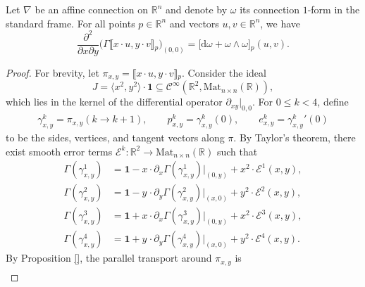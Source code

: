 \newpage 
\begin{theorem}
  Let $\nabla$ be an affine connection on $\mathbb{R}^n$ and denote by $\omega$ its connection $1$-form in the standard frame. For all points $p \in \mathbb{R}^n$ and vectors $u, v \in \mathbb{R}^n$, we have 
  \begin{equation}
    \frac{\partial^2}{\partial x \partial y} \Big( \Gamma \bigl\llbracket x \cdot u, y \cdot v \bigr\rrbracket{}_p \Big)_{(0, 0)} =  \big[\mathrm{d}\omega + \omega \wedge \omega\big]{}_p(u, v).
  \end{equation}
\end{theorem}

\begin{proof}
For brevity, let $\pi_{x, y} = \bigl\llbracket x \cdot u, y \cdot v \bigr\rrbracket{}_p$. Consider the ideal 
\begin{equation}
J = \langle x^2, y^2\rangle \cdot \mathbf{1} \subseteq \mathscr{C}^\infty(\mathbb{R}^2, \mathrm{Mat}_{n \times n}(\mathbb{R})),
\end{equation}
which lies in the kernel of the differential operator $\partial_{xy}|_{0,0}$. For $0 \leq k < 4$,  define 
  \begin{align}
    \gamma^{k}_{x, y} = \pi_{x, y}(k \to k + 1), \quad \quad p^{k}_{x,y} = \gamma^k_{x, y}(0), \quad \quad  e^k_{x, y} = {\gamma^k_{x, y}}{}'(0) 
  \end{align}
  to be the sides, vertices, and tangent vectors along $\pi$. By Taylor's theorem, there exist smooth error terms $\mathcal{E}^k \colon \mathbb{R}^2 \to \mathrm{Mat}_{n \times n}(\mathbb{R})$ such that
  \begin{align}
    \Gamma(\gamma^{1}_{x,y}) &= \mathbf{1} - x \cdot \partial_x \Gamma(\gamma^{1}_{x,y})|_{(0, y)} + x^2 \cdot \mathcal{E}^1(x, y), \\
    \Gamma(\gamma^{2}_{x,y}) &= \mathbf{1} - y \hspace{1pt} \cdot \partial_y \Gamma(\gamma^{2}_{x,y})|_{(x, 0)} + y^2 \cdot \mathcal{E}^2(x, y), \\
    \Gamma(\gamma^{3}_{x,y}) &= \mathbf{1} + x \cdot \partial_x \Gamma(\gamma^{3}_{x,y})|_{(0, y)} + x^2 \cdot \mathcal{E}^3(x, y), \\
    \Gamma(\gamma^{4}_{x,y}) &= \mathbf{1} + y \hspace{1pt} \cdot \partial_y \Gamma(\gamma^{4}_{x,y})|_{(x, 0)} + y^2 \cdot \mathcal{E}^4(x, y).
  \end{align}
  By Proposition \ref{}, the parallel transport around $\pi_{x,y}$ is
  \begin{align}

\end{align}
\end{proof}
